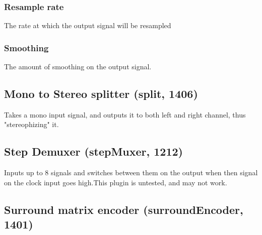 \documentclass[11pt]{article}
\begin{document}
\subsubsection*{Resample rate}
The rate at which the output signal will be resampled\subsubsection*{Smoothing}
The amount of smoothing on the output signal.\subsection{Mono to Stereo splitter (split, 1406)\label{split}\label{id1406}}
Takes a mono input signal, and outputs it to both left and right channel, thus "stereophizing" it.\subsection{Step Demuxer (stepMuxer, 1212)\label{stepMuxer}\label{id1212}}
Inputs up to 8 signals and switches between them on the output when then signal on the clock input goes high.This plugin is untested, and may not work.\subsection{Surround matrix encoder (surroundEncoder, 1401)\label{surroundEncoder}\label{id1401}}
\end{document}
